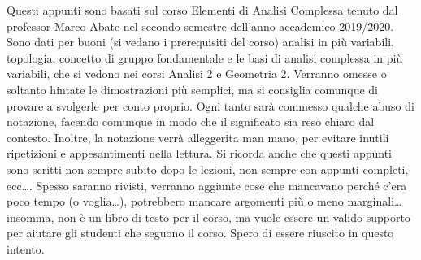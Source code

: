 Questi appunti sono basati sul corso Elementi di Analisi Complessa tenuto dal professor Marco Abate nel secondo semestre dell'anno accademico 2019/2020. Sono dati per buoni (si vedano i prerequisiti del corso) analisi in più variabili, topologia, concetto di gruppo fondamentale e le basi di analisi complessa in più variabili, che si vedono nei corsi Analisi 2 e Geometria 2. Verranno omesse o soltanto hintate le dimostrazioni più semplici, ma si consiglia comunque di provare a svolgerle per conto proprio. Ogni tanto sarà commesso qualche abuso di notazione, facendo comunque in modo che il significato sia reso chiaro dal contesto. Inoltre, la notazione verrà alleggerita man mano, per evitare inutili ripetizioni e appesantimenti nella lettura. Si ricorda anche che questi appunti sono scritti non sempre subito dopo le lezioni, non sempre con appunti completi, ecc\dots. Spesso saranno rivisti, verranno aggiunte cose che mancavano perché c'era poco tempo (o voglia\dots), potrebbero mancare argomenti più o meno marginali\dots insomma, non è un libro di testo per il corso, ma vuole essere un valido supporto per aiutare gli studenti che seguono il corso. Spero di essere riuscito in questo intento.
